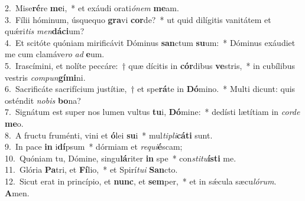 {2.~}Mise\textbf{ré}re \textbf{me}i,~* et exáudi orati\textit{ó}\textit{nem} \textbf{me}am.\\
{3.~}Fílii hóminum, úsquequo \textbf{gra}vi \textbf{cor}de?~* ut quid dilígitis vanitátem et quǽri\textit{tis} \textit{men}\textbf{dá}\textbf{ci}um?\\
{4.~}Et scitóte quóniam mirificávit Dóminus \textbf{san}ctum \textbf{su}um:~* Dóminus exáudiet me cum clamáve\textit{ro} \textit{ad} \textbf{e}um.\\
{5.~}Irascímini, et nolíte peccáre:~† quæ dícitis in \textbf{cór}dibus \textbf{ve}stris,~* in cubílibus vestris \textit{com}\textit{pun}\textbf{gí}\textbf{mi}ni.\\
{6.~}Sacrificáte sacrifícium justítiæ,~† et spe\textbf{rá}te in \textbf{Dó}mino.~* Multi dicunt: quis osténdit \textit{no}\textit{bis} \textbf{bo}na?\\
{7.~}Signátum est super nos lumen vultus \textbf{tu}i, \textbf{Dó}mine:~* dedísti lætítiam in \textit{cor}\textit{de} \textbf{me}o.\\
{8.~}A fructu fruménti, vini et \textbf{ó}lei \textbf{su}i~* mul\textit{ti}\textit{pli}\textbf{cá}\textbf{ti} sunt.\\
{9.~}In pace \textbf{in} i\textbf{dí}psum~* dórmiam et \textit{re}\textit{qui}\textbf{é}scam;\\
{10.~}Quóniam tu, Dómine, singu\textbf{lá}riter \textbf{in} spe~* con\textit{sti}\textit{tu}\textbf{í}\textbf{sti} me.\\
{11.~}Glória \textbf{Pa}tri, et \textbf{Fí}lio,~* et Spirí\textit{tu}\textit{i} \textbf{San}cto.\\
{12.~}Sicut erat in princípio, et \textbf{nunc}, et \textbf{sem}per,~* et in sǽcula sæcu\textit{ló}\textit{rum}. \textbf{A}men.\\

